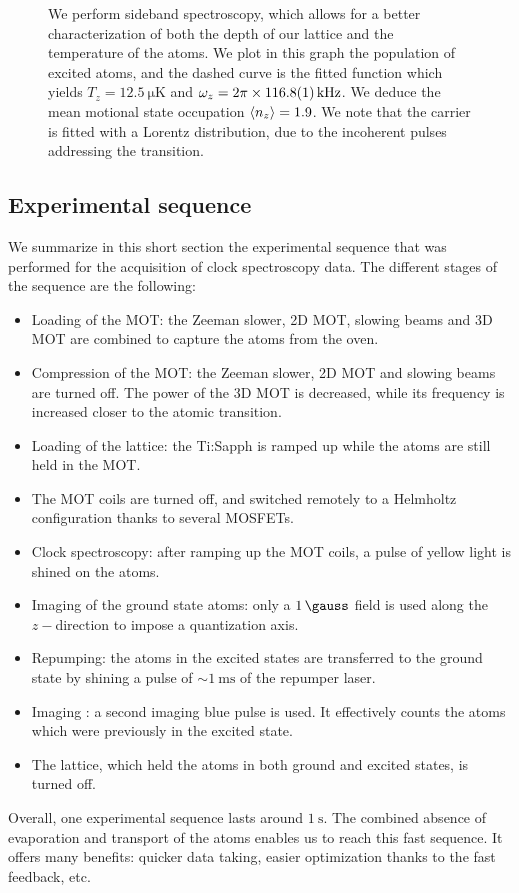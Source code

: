 \documentclass[11pt]{article}
\numberwithin{equation}{section}
\numberwithin{figure}{section}
\begin{document}
%
\begin{figure}[htbp]
	\centering
    
	\caption{\small We perform sideband spectroscopy, which allows for a better characterization of both the depth of our lattice and the temperature of the atoms. We plot in this graph the population of excited atoms, and the dashed curve is the fitted function which yields $T_z = \SI{12.5}{\micro\kelvin}$ and $\omega_z = 2 \pi \times \SI{116.8\pm0.1}{\kilo\hertz}$. We deduce the mean motional state occupation $\expval{n_z} = 1.9$. We note that the carrier is fitted with a Lorentz distribution, due to the incoherent pulses addressing the transition.}
    \label{fig:sideband_spectrum}
\end{figure}
%

\subsection{Experimental sequence}

We summarize in this short section the experimental sequence that was performed for the acquisition of clock spectroscopy data. The different stages of the sequence are the following:
%
\begin{itemize}
	\item Loading of the MOT: the Zeeman slower, 2D MOT, slowing beams and 3D MOT are combined to capture the atoms from the oven.
	\item Compression of the MOT: the Zeeman slower, 2D MOT and slowing beams are turned off. The power of the 3D MOT is decreased, while its frequency is increased closer to the atomic transition.
	\item Loading of the lattice: the Ti:Sapph is ramped up while the atoms are still held in the MOT.
	\item The MOT coils are turned off, and switched remotely to a Helmholtz configuration thanks to several MOSFETs.
	\item Clock spectroscopy: after ramping up the MOT coils, a pulse of yellow light is shined on the atoms.
	\item Imaging of the ground state atoms: only a $\SI{1}{\gauss}$ field is used along the $z-$direction to impose a quantization axis.
	\item Repumping: the atoms in the excited states are transferred to the ground state by shining a pulse of $\sim \SI{1}{\milli\second}$ of the repumper laser.
	\item Imaging : a second imaging blue pulse is used. It effectively counts the atoms which were previously in the excited state.
	\item The lattice, which held the atoms in both ground and excited states, is turned off.
\end{itemize}
%
Overall, one experimental sequence lasts around $\SI{1}{\second}$. The combined absence of evaporation and transport of the atoms enables us to reach this fast sequence. It offers many benefits: quicker data taking, easier optimization thanks to the fast feedback, etc.
\end{document}
